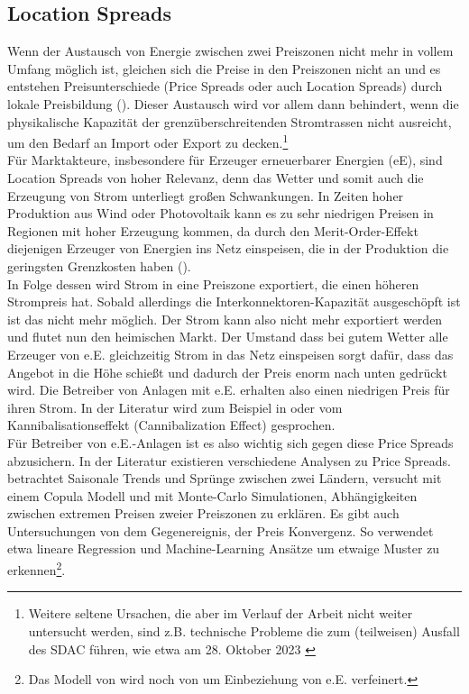\newpage
\subsection{Location Spreads}
\label{sec:Location Spreads}

Wenn der Austausch von Energie zwischen zwei Preiszonen nicht mehr in vollem Umfang möglich ist, gleichen sich die Preise in den Preiszonen nicht an und es entstehen Preisunterschiede (Price Spreads oder auch Location Spreads) durch lokale Preisbildung (\cite{3}). Dieser Austausch wird vor allem dann  behindert, wenn die physikalische Kapazität der grenzüberschreitenden Stromtrassen nicht ausreicht, um den Bedarf an Import oder Export zu decken.\footnote{Weitere seltene Ursachen, die aber im Verlauf der Arbeit nicht weiter untersucht werden, sind z.B. technische Probleme die zum (teilweisen) Ausfall des SDAC führen, wie etwa am 28. Oktober 2023 \cite{ENTSOE_market_report}} \\
Für Marktakteure, insbesondere für Erzeuger erneuerbarer Energien (eE), sind Location Spreads von hoher Relevanz, denn das Wetter und somit auch die Erzeugung von Strom unterliegt großen Schwankungen. In Zeiten hoher Produktion aus Wind oder Photovoltaik kann es zu sehr niedrigen Preisen in Regionen mit hoher Erzeugung kommen, da durch den Merit-Order-Effekt diejenigen Erzeuger von Energien ins Netz einspeisen, die in der Produktion die geringsten Grenzkosten haben (\cite{7}).\\
In Folge dessen wird Strom in eine Preiszone exportiert, die einen höheren Strompreis hat. Sobald allerdings die Interkonnektoren-Kapazität ausgeschöpft ist ist das nicht mehr möglich. Der Strom kann also nicht mehr exportiert werden und flutet nun den heimischen Markt. Der Umstand dass bei gutem Wetter alle Erzeuger von e.E. gleichzeitig Strom in das Netz einspeisen sorgt dafür, dass das Angebot in die Höhe schießt und dadurch der Preis enorm nach unten gedrückt wird. Die Betreiber von Anlagen mit e.E. erhalten also einen niedrigen Preis für ihren Strom. In der Literatur wird zum Beispiel in \cite{7} oder \cite{8} vom Kannibalisationseffekt (Cannibalization Effect) gesprochen. \\
Für Betreiber von e.E.-Anlagen ist es also wichtig sich gegen diese Price Spreads abzusichern. In der Literatur existieren verschiedene Analysen zu Price Spreads. \cite{10} betrachtet Saisonale Trends und Sprünge zwischen zwei Ländern, \cite{12} versucht mit einem Copula Modell und \cite{15} mit Monte-Carlo Simulationen, Abhängigkeiten zwischen extremen Preisen zweier Preiszonen zu erklären. Es gibt auch Untersuchungen von dem Gegenereignis, der Preis Konvergenz. So verwendet \cite{13} etwa lineare Regression und \cite{16} Machine-Learning Ansätze um etwaige Muster zu erkennen\footnote{Das Modell von \cite{16} wird noch von \cite{20} um Einbeziehung von e.E. verfeinert.}.



